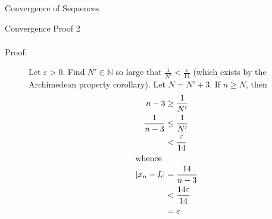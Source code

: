 \documentclass[10pt]{extarticle}
\newcommand{\N}{\mathbb{N}}
\begin{document}
\begin{problem}{Convergence of Sequences}
\begin{problem}{Convergence Proof 2}
\begin{align*}
      \end{align*}
      \begin{description}
        \item[Proof:] Let $\varepsilon > 0$. Find $N' \in\N$ so large that $\frac{1}{N'} < \frac{\varepsilon}{14}$ (which exists by the Archimedean property corollary). Let $N = N' + 3$. If $n \geq N$, then
          \begin{align*}
            n-3 &\geq \frac{1}{N'}\\
            \frac{1}{n-3} &\leq \frac{1}{N'}\\
                          &< \frac{\varepsilon}{14}\\
                          \shortintertext{whence}
            |x_n - L| &= \frac{14}{n-3}\\
                      &< \frac{14\varepsilon}{14}\\
                      &= \varepsilon
          \end{align*}
      \end{description}
    \end{problem}
  \end{problem}
\end{document}
